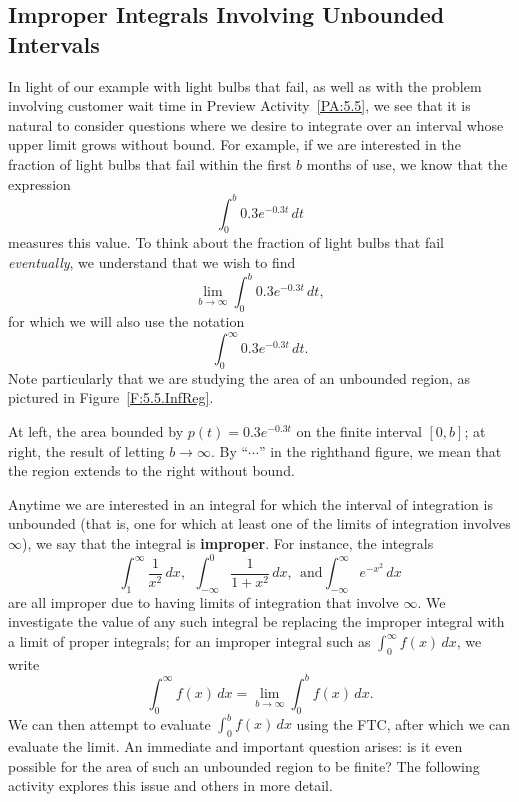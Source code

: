 \subsection*{Improper Integrals Involving Unbounded Intervals} 

In light of our example with light bulbs that fail, as well as with the problem involving customer wait time in Preview Activity~\ref{PA:5.5}, we see that it is natural to consider questions where we desire to integrate over an interval whose upper limit grows without bound.  For example, if we are interested in the fraction of light bulbs that fail within the first $b$ months of use, we know that the expression
$$\int_0^b 0.3e^{-0.3t} \, dt$$
measures this value.  To think about the fraction of light bulbs that fail \emph{eventually}, we understand that we wish to find
$$\lim_{b \to \infty} \int_0^b 0.3e^{-0.3t} \, dt,$$
for which we will also use the notation 
\begin{equation} \label{E:ImpInt1}
\int_0^\infty 0.3e^{-0.3t} \, dt.
\end{equation}
Note particularly that we are studying the area of an unbounded region, as pictured in Figure~\ref{F:5.5.InfReg}.

\begin{marginfigure} %
\caption{At left, the area bounded by $p(t) = 0.3e^{-0.3t}$ on the finite interval $[0,b]$; at right, the result of letting $b \to \infty$.  By ``$\cdots$'' in the righthand figure, we mean that the region extends to the right without bound.} \label{F:5.5.InfReg}
\end{marginfigure}

Anytime we are interested in an integral for which the interval of integration is unbounded (that is, one for which at least one of the limits of integration involves $\infty$), we say that the integral is {\bf improper}.  For instance, the integrals
$$\int_1^{\infty} \frac{1}{x^2} \, dx, \ \ \int_{-\infty}^0 \frac{1}{1+x^2} \, dx, \ \ \mbox{and} \int_{-\infty}^{\infty} e^{-x^2} \, dx$$
are all improper due to having limits of integration that involve $\infty$.  We investigate the value of any such integral be replacing the improper integral with a limit of proper integrals; for an improper integral such as $\int_0^\infty f(x) \, dx$, we write
$$\int_0^\infty f(x) \, dx = \lim_{b \to \infty} \int_0^b f(x) \,dx.$$
We can then attempt to evaluate $\int_0^b f(x) \,dx$ using the FTC, after which we can evaluate the limit.  An immediate and important question arises: is it even possible for the area of such an unbounded region to be finite?  The following activity explores this issue and others in more detail.

